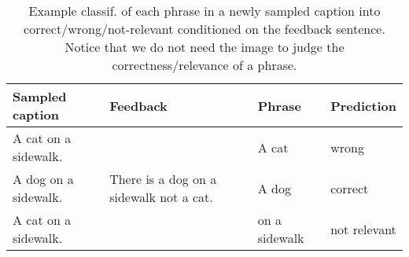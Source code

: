 \begin{table}[t!] %
\vspace{-0mm}
    \centering %
    \small
    \addtolength{\tabcolsep}{4pt}
      \begin{tabular}{llll}
    \toprule
    Sampled caption     & Feedback & Phrase     & Prediction\\
    \midrule
    A cat on a sidewalk. & & A cat  &  wrong    \\
    A dog on a sidewalk.     & There is a dog on a sidewalk not a cat.& A dog&  correct     \\
    A cat on a sidewalk.     &      &on a sidewalk& not relevant \\
    \bottomrule
  \end{tabular}
  \vspace{1mm}
      \caption{\small Example classif. of each phrase in  a newly sampled caption into correct/wrong/not-relevant conditioned  on the feedback sentence. Notice that we do not need the image to judge the correctness/relevance of a phrase.}
    \label{table:feedbacknetTable}
    \vspace{-2mm}
\end{table}

\vspace{-2mm}
